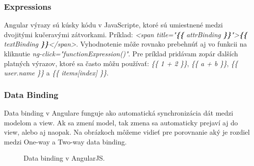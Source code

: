 \subsubsection{Expressions}
Angular výrazy sú kúsky kódu v JavaScripte, ktoré sú umiestnené medzi dvojitými kučeravými zátvorkami. Príklad: \textit{<span title="\textbf{\{\{} attrBinding \textbf{\}\}}">\textbf{\{\{} textBinding \textbf{\}\}}</span>}. Vyhodnotenie môže rovnako prebehnúť aj vo funkcii na kliknutie \textit{ng-click="functionExpression()"}.
Pre príklad pridávam zopár ďalších platných výrazov, ktoré sa často môžu používať: \textit{\{\{ 1 + 2 \}\}}, \textit{\{\{ a + b \}\}}, \textit{\{\{ user.name \}\}} a 
\textit{\{\{ items[index] \}\}}.




\subsubsection{Data Binding}
Data binding v Angulare funguje ako automatická synchronizácia dát medzi modelom a view. Ak sa zmení model, tak zmena sa automaticky prejaví aj do view, alebo aj naopak.
Na obrázkoch môžeme vidieť pre porovnanie aký je rozdiel medzi One-way a Two-way data binding.

\begin{figure}[H]
\caption{Data binding v AngularJS.}
\end{figure}


